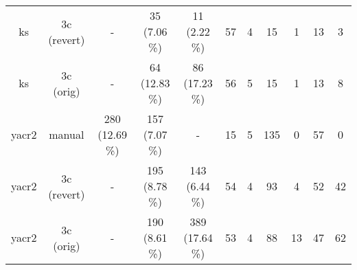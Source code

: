 \begin{tabular}{c|c|ccc|cccc|c|c}
\rowcolor[rgb]{0.8,0.8,0.8}
 ks & 3c (revert) & - & 35 (7.06 \%) & 11 (2.22 \%) & 57 & 4 & 15 & 1 & 13 & 3 \\

\rowcolor[rgb]{0.8,0.8,0.8}
 ks & 3c (orig) & - & 64 (12.83 \%) & 86 (17.23 \%) & 56 & 5 & 15 & 1 & 13 & 8 \\

\rowcolor{white}
 yacr2 & manual & 280 (12.69 \%) & 157 (7.07 \%) & - & 15 & 5 & 135 & 0 & 57 & 0 \\

\rowcolor{white}
 yacr2 & 3c (revert) & - & 195 (8.78 \%) & 143 (6.44 \%) & 54 & 4 & 93 & 4 & 52 & 42 \\

\rowcolor{white}
 yacr2 & 3c (orig) & - & 190 (8.61 \%) & 389 (17.64 \%) & 53 & 4 & 88 & 13 & 47 & 62 \\

\bottomrule
\end{tabular}
